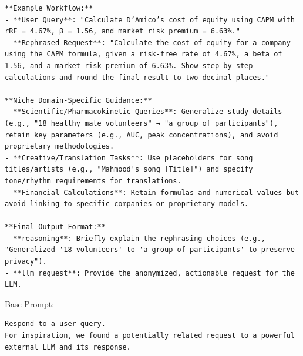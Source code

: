 \begin{instructbox}
\begin{lstlisting}[breakindent=0pt, breaklines=true, breakatwhitespace=true, frame=single, backgroundcolor=\color{blue!10}]
**Example Workflow:**  
- **User Query**: "Calculate D’Amico’s cost of equity using CAPM with rRF = 4.67%, β = 1.56, and market risk premium = 6.63%."  
- **Rephrased Request**: "Calculate the cost of equity for a company using the CAPM formula, given a risk-free rate of 4.67%, a beta of 1.56, and a market risk premium of 6.63%. Show step-by-step calculations and round the final result to two decimal places."  

**Niche Domain-Specific Guidance:**  
- **Scientific/Pharmacokinetic Queries**: Generalize study details (e.g., "18 healthy male volunteers" → "a group of participants"), retain key parameters (e.g., AUC, peak concentrations), and avoid proprietary methodologies.  
- **Creative/Translation Tasks**: Use placeholders for song titles/artists (e.g., "Mahmood's song [Title]") and specify tone/rhythm requirements for translations.  
- **Financial Calculations**: Retain formulas and numerical values but avoid linking to specific companies or proprietary models.  

**Final Output Format:**  
- **reasoning**: Briefly explain the rephrasing choices (e.g., "Generalized '18 volunteers' to 'a group of participants' to preserve privacy").  
- **llm_request**: Provide the anonymized, actionable request for the LLM.
\end{lstlisting}
\end{instructbox}\begin{instructbox}
Base Prompt:
\begin{lstlisting}[breakindent=0pt, breaklines=true, breakatwhitespace=true, frame=single, backgroundcolor=\color{gray!10}]
Respond to a user query.
For inspiration, we found a potentially related request to a powerful external LLM and its response.
\end{lstlisting}


\end{instructbox}
